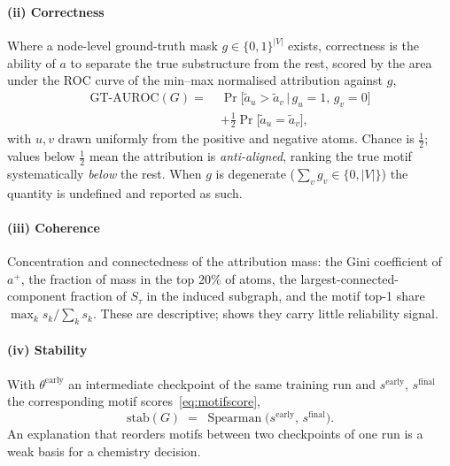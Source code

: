 \paragraph{(ii) Correctness} Where a node-level ground-truth mask
$g\in\{0,1\}^{|V|}$ exists, correctness is the ability of $a$ to separate the
true substructure from the rest, scored by the area under the ROC curve of the
min--max normalised attribution against $g$,
\begin{equation}
  \begin{aligned}
    \mathrm{GT\text{-}AUROC}(G) =\;
      &\Pr\big[\tilde a_u > \tilde a_v \,\big|\, g_u{=}1,\, g_v{=}0\big]\\[-1pt]
      &+\tfrac12\Pr\big[\tilde a_u = \tilde a_v\big],
  \end{aligned}
  \label{eq:gtauroc}
\end{equation}
with $u,v$ drawn uniformly from the positive and negative atoms. Chance is
$\tfrac12$; values below $\tfrac12$ mean the attribution is \emph{anti-aligned},
ranking the true motif systematically \emph{below} the rest. When $g$ is
degenerate ($\sum_v g_v\in\{0,|V|\}$) the quantity is undefined and reported as
such.

\paragraph{(iii) Coherence} Concentration and connectedness of the attribution
mass: the Gini coefficient of $a^+$, the fraction of mass in the top $20\%$ of
atoms, the largest-connected-component fraction of $S_\tau$ in the induced
subgraph, and the motif top-1 share $\max_k s_k/\sum_k s_k$. These are
descriptive;  shows they carry little reliability
signal.

\paragraph{(iv) Stability} With $\theta^{\mathrm{early}}$ an intermediate
checkpoint of the same training run and $s^{\mathrm{early}}$, $s^{\mathrm{final}}$
the corresponding motif scores~\eqref{eq:motifscore},
\begin{equation}
  \mathrm{stab}(G) \;=\;
  \operatorname{Spearman}\big(s^{\mathrm{early}},\,s^{\mathrm{final}}\big).
  \label{eq:stab}
\end{equation}
An explanation that reorders motifs between two checkpoints of one run is a
weak basis for a chemistry decision.

